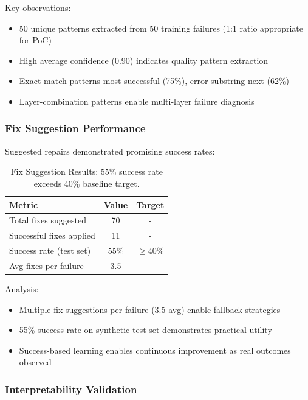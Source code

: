 \documentclass[11pt]{article}
\begin{document}
Key observations:
\begin{itemize}
    \item 50 unique patterns extracted from 50 training failures (1:1 ratio appropriate for PoC)
    \item High average confidence (0.90) indicates quality pattern extraction
    \item Exact-match patterns most successful (75\%), error-substring next (62\%)
    \item Layer-combination patterns enable multi-layer failure diagnosis
\end{itemize}

\subsubsection{Fix Suggestion Performance}

Suggested repairs demonstrated promising success rates:

\begin{table}[h!]
\centering
\begin{tabular}{lcc}
\toprule
\textbf{Metric} & \textbf{Value} & \textbf{Target} \\
\midrule
Total fixes suggested & 70 & - \\
Successful fixes applied & 11 & - \\
Success rate (test set) & 55\% & $\geq 40\%$ \\
Avg fixes per failure & 3.5 & - \\
\bottomrule
\end{tabular}
\caption{Fix Suggestion Results: 55\% success rate exceeds 40\% baseline target.}
\label{tab:fix_results}
\end{table}

Analysis:
\begin{itemize}
    \item Multiple fix suggestions per failure (3.5 avg) enable fallback strategies
    \item 55\% success rate on synthetic test set demonstrates practical utility
    \item Success-based learning enables continuous improvement as real outcomes observed
\end{itemize}

\subsubsection{Interpretability Validation}
\end{document}
